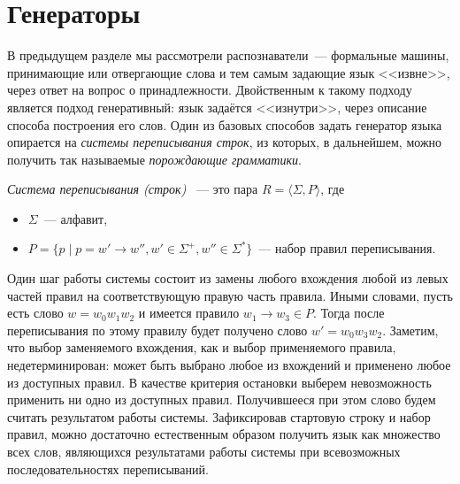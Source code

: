 \section{Генераторы}
\label{sec:Generators}

В предыдущем разделе мы рассмотрели распознаватели~--- формальные машины, принимающие или отвергающие слова и тем самым задающие язык <<извне>>, через ответ на вопрос о принадлежности.
Двойственным к такому подходу является подход генеративный: язык задаётся <<изнутри>>, через описание способа построения его слов.
Один из базовых способов задать генератор языка опирается на \emph{системы переписывания строк}, из которых, в дальнейшем, можно получить так называемые \emph{порождающие грамматики}.

\begin{definition}
    \label{def:RewritingSystem}
    \emph{Система переписывания (строк)}%
    ~---
    это пара $R = \langle \Sigma, P \rangle$, где
    \begin{itemize}
        \item $\Sigma$~--- алфавит,
        \item $P= \{p \mid p = w' \to w'', w' \in \Sigma^+, w'' \in \Sigma^*\}$~--- набор правил переписывания.
    \end{itemize}
\end{definition}

Один шаг работы системы состоит из замены любого вхождения любой из левых частей правил на соответствующую правую часть правила.
Иными словами, пусть есть слово $w = w_0 w_1 w_2$ и имеется правило $w_1 \to w_3 \in P$.
Тогда после переписывания по этому правилу будет получено слово $w' = w_0 w_3 w_2$.
Заметим, что выбор заменяемого вхождения, как и выбор применяемого правила, недетерминирован: может быть выбрано любое из вхождений и применено любое из доступных правил.
В качестве критерия остановки выберем невозможность применить ни одно из доступных правил.
Получившееся при этом слово будем считать результатом работы системы.
Зафиксировав стартовую строку и набор правил, можно достаточно естественным образом получить язык как множество всех слов, являющихся результатами работы системы при всевозможных последовательностях переписываний.

